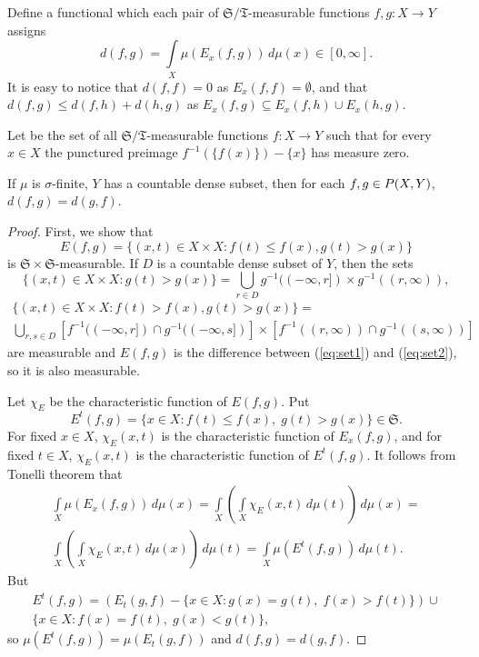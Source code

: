 Define a functional which each pair of $\mathfrak{S} /
\mathfrak{T}$-measurable functions $f, g \colon X \to Y$ assigns
\[ d(f, g) = \int \limits_X \mu(E_x(f, g)) \, d\mu(x) \in [0,
  \infty]. \] It is easy to notice that $d(f, f) = 0$ as $E_x(f, f) =
\emptyset$, and that $d(f, g) \leq d(f, h) + d(h, g)$ as $E_x(f, g)
\subseteq E_x(f, h) \cup E_x(h, g)$.

Let  be the set of all $\mathfrak{S} /
\mathfrak{T}$-measurable functions $f \colon X \to Y$ such that for
every $x \in X$ the punctured preimage $f^{-1}(\{f(x)\}) - \{x\}$ has
measure zero.

\begin{lem}
If $\mu$ is $\sigma$-finite, $Y$ has a countable dense subset, then
for each $f, g \in P(X, Y)$, $d(f, g) = d(g, f)$.
\end{lem}

\begin{proof}
First, we show that \[ E(f, g) = \{ (x, t) \in X \times X \colon f(t)
\leq f(x), g(t) > g(x) \} \] is $\mathfrak{S} \times
\mathfrak{S}$-measurable. If $D$ is a countable dense subset of $Y$,
then the sets
\begin{equation} \label{eq:set1}
\{ (x, t) \in X \times X \colon g(t) > g(x) \} = \bigcup_{r \in D}
g^{-1}((-\infty, r]) \times g^{-1}((r, \infty)),
\end{equation}
\begin{multline} \label{eq:set2}
  \{ (x, t) \in X \times X \colon f(t) > f(x), g(t) > g(x) \} =
  \\ \bigcup_{r, s \in D} \left[ f^{-1}((-\infty, r]) \cap
  g^{-1}((-\infty, s]) \right] \times \left[ f^{-1}((r, \infty)) \cap
        g^{-1}((s, \infty)) \right]
\end{multline}
are measurable and $E(f, g)$ is the difference between (\ref{eq:set1})
and (\ref{eq:set2}), so it is also measurable.

Let $\chi_E$ be the characteristic function of $E(f, g)$. Put \[
E^t(f, g) = \{x \in X \colon f(t) \leq f(x), \; g(t) > g(x)\} \in
\mathfrak{S}. \] For fixed $x \in X$, $\chi_E(x, t)$ is the
characteristic function of $E_x(f, g)$, and for fixed $t \in X$,
$\chi_E(x, t)$ is the characteristic function of $E^t(f, g)$. It
follows from Tonelli theorem \cite [p.~231] {billingsley-2009} that
\[ \begin{split}
  \int \limits_X \mu(E_x(f, g)) \, d\mu(x) =
  \int \limits_X \left( \int \limits_X \chi_E(x, t) \, d\mu(t) \right)
  \, d\mu(x) = \\
  \int \limits_X \left( \int \limits_X \chi_E(x, t) \, d\mu(x) \right)
  \, d\mu(t) =
  \int \limits_X \mu(E^t(f, g)) \, d\mu(t).
\end{split} \]
But
\begin{multline*}
  E^t(f, g) = \left( E_t(g, f) - \{x \in X \colon g(x) = g(t), \; f(x)
  > f(t)\} \right) \cup \\ \{x \in X \colon f(x) = f(t), \; g(x) <
  g(t)\},
\end{multline*}
so $\mu(E^t(f, g)) = \mu(E_t(g, f))$ and $d(f, g) = d(g, f)$.
\end{proof}

